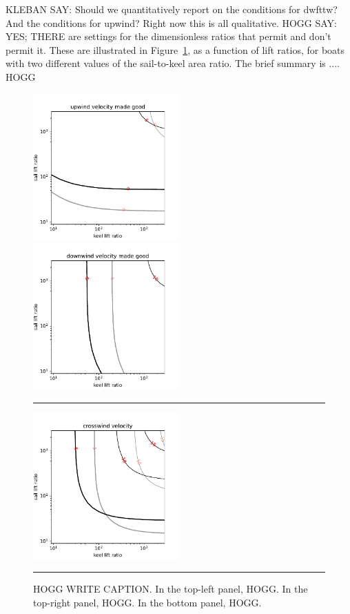 \documentclass[letterpaper]{article}
\newcommand{\figref}[1]{Figure~\ref{#1}}
\newcommand{\figurerule}{\rule[1ex]{\textwidth}{0.2pt}}
\begin{document}
KLEBAN SAY: Should we quantitatively report on the conditions for dwfttw? And the conditions for upwind? Right now this is all qualitative.
HOGG SAY: YES; THERE are settings for the dimensionless ratios that permit and don't permit it. These are illustrated in \figref{fig:dwfttw}, as a function of lift ratios, for boats with two different values of the sail-to-keel area ratio.
The brief summary is .... HOGG
\begin{figure}[t!]
  \includegraphics[width=0.5\textwidth]{upwind_vmg.pdf}%
  \includegraphics[width=0.5\textwidth]{downwind_vmg.pdf}\\%
  \rule{0.25\textwidth}{0pt}\includegraphics[width=0.5\textwidth]{crosswind_vmg.pdf}
  \caption{HOGG WRITE CAPTION.
  In the top-left panel, HOGG.
  In the top-right panel, HOGG.
  In the bottom panel, HOGG.\label{fig:dwfttw}}
  \figurerule
\end{figure}
\end{document}
